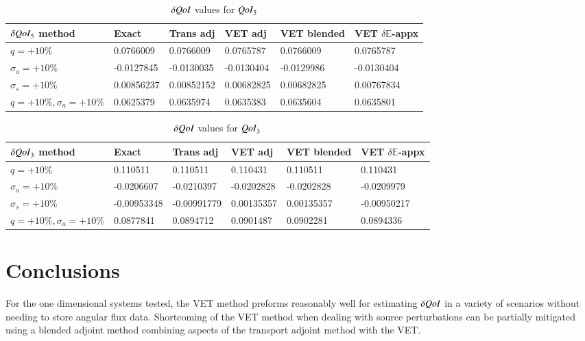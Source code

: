 \documentclass{anstrans}
\newcommand{\Edd}{\mathbb{E}}
\newcommand{\sigs}{\sigma_s}
\newcommand{\siga}{\sigma_a}
\newcommand{\qoi}{{\it QoI}\xspace}
\begin{document}
\begin{table}
  \centering
  \caption{$\delta \qoi$ values for $\qoi_5$}
  \begin{tabular}{l|lllll}\toprule
  $\delta\qoi_5$ method    & Exact     & Trans adj     & VET adj      &   VET blended  & VET $\delta \Edd$-appx 
\\ \midrule
$q=+10\%$  & 0.0766009  & 0.0766009  & 0.0765787 & 0.0766009  & 0.0765787
\\
$\siga=+10\%$  &-0.0127845  & -0.0130035 & -0.0130404  & -0.0129986 & -0.0130404
\\
$\sigs=+10\%$  & 0.00856237  & 0.00852152  & 0.00682825  & 0.00682825  & 0.00767834 
\\
$q=+10\%,\siga=+10\%$  & 0.0625379 & 0.0635974  & 0.0635383 & 0.0635604  &  0.0635801 
\\
\bottomrule
\end{tabular}
  \label{tab:qoi1}
\end{table}


\begin{table}
  \centering
  \caption{$\delta \qoi$ values for $\qoi_3$}
  \begin{tabular}{l|lllll}\toprule
  $\delta\qoi_3$ method    & Exact     & Trans adj     & VET adj      &   VET blended  & VET $\delta \Edd$-appx 
\\ \midrule
$q=+10\%$  & 0.110511   & 0.110511   & 0.110431 & 0.110511   & 0.110431 
\\
$\siga=+10\%$  &-0.0206607  & -0.0210397 & -0.0202828   & -0.0202828  & -0.0209979
\\
$\sigs=+10\%$  & -0.00953348   & -0.00991779   & 0.00135357   & 0.00135357   & -0.00950217 
\\
$q=+10\%,\siga=+10\%$  & 0.0877841  & 0.0894712   & 0.0901487 & 0.0902281   &  0.0894336  
\\
\bottomrule
\end{tabular}
  \label{tab:qoi2}
\end{table}



\section{Conclusions}
For the one dimensional systems tested, the VET method preforms reasonably well for estimating $\delta \qoi$ in a  variety of scenarios without needing to store angular flux data. Shortcoming of the VET method when dealing with source perturbations can be partially mitigated using a blended adjoint method combining aspects of the transport adjoint method with the VET. 
\end{document}
